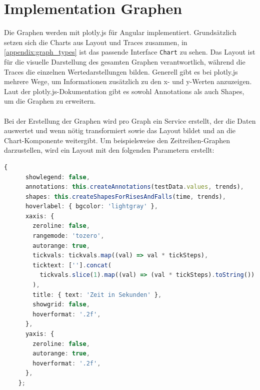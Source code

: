 \section{Implementation Graphen}
Die Graphen werden mit plotly.js für Angular implementiert. Grundsätzlich setzen sich die Charts aus Layout und Traces zusammen, in \ref{appendix:graph_types} ist das passende Interface \texttt{Chart} zu sehen. Das Layout ist für die visuelle Darstellung des gesamten Graphen verantwortlich, während die Traces die einzelnen Wertedarstellungen bilden. Generell gibt es bei plotly.js mehrere Wege, um Informationen zusätzlich zu den x- und y-Werten anzuzeigen. Laut der plotly.js-Dokumentation \cite{Plotly.2024b} gibt es sowohl Annotations als auch Shapes, um die Graphen zu erweitern.\\\\ Bei der Erstellung der Graphen wird pro Graph ein Service erstellt, der die Daten auswertet und wenn nötig transformiert sowie das Layout bildet und an die Chart-Komponente weitergibt. Um beispielsweise den Zeitreihen-Graphen darzustellen, wird ein Layout mit den folgenden Parametern erstellt:
\begin{lstlisting}[language=Typescript]
    {
      showlegend: false,
      annotations: this.createAnnotations(testData.values, trends),
      shapes: this.createShapesForRisesAndFalls(time, trends),
      hoverlabel: { bgcolor: 'lightgray' },
      xaxis: {
        zeroline: false,
        rangemode: 'tozero',
        autorange: true,
        tickvals: tickvals.map((val) => val * tickSteps),
        ticktext: [''].concat(
          tickvals.slice(1).map((val) => (val * tickSteps).toString())
        ),
        title: { text: 'Zeit in Sekunden' },
        showgrid: false,
        hoverformat: '.2f',
      },
      yaxis: {
        zeroline: false,
        autorange: true,
        hoverformat: '.2f',
      },
    };
\end{lstlisting}
